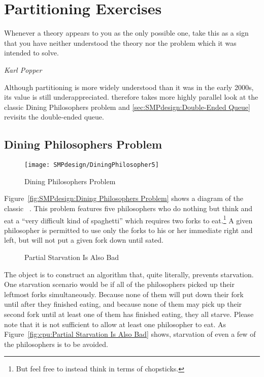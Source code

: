 
\section{Partitioning Exercises}
\label{sec:SMPdesign:Partitioning Exercises}
%
\epigraph{Whenever a theory appears to you as the only possible one,
	  take this as a sign that you have neither understood the theory
	  nor the problem which it was intended to solve.}
	  {\emph{Karl Popper}}

Although partitioning is more widely understood than it was in the early
2000s, its value is still underappreciated.
therefore takes more highly parallel look at the classic Dining
Philosophers problem and
\cref{sec:SMPdesign:Double-Ended Queue}
revisits the double-ended queue.

\subsection{Dining Philosophers Problem}
\label{sec:SMPdesign:Dining Philosophers Problem}

\begin{figure}[tb]
\centering
\texttt{[image: SMPdesign/DiningPhilosopher5]}
\caption{Dining Philosophers Problem}
\end{figure}

Figure~\ref{fig:SMPdesign:Dining Philosophers Problem} shows a diagram
of the classic ~\cite{Dijkstra1971HOoSP}.
This problem features five philosophers who do nothing but think and
eat a ``very difficult kind of spaghetti'' which requires two forks
to eat.\footnote{
	But feel free to instead think in terms of chopsticks.}
A given philosopher is permitted to use only the forks to his or her
immediate right and left, but will not put a given fork down until sated.

\begin{figure*}[tb]
\centering
{}
\caption{Partial Starvation Is Also Bad}
\end{figure*}

The object is to construct an algorithm that, quite literally,
prevents starvation.
One starvation scenario would be if all of the philosophers picked up
their leftmost forks simultaneously.
Because none of them will put down their fork until after they finished
eating, and because none of them may pick up their second fork until at
least one of them has finished eating, they all starve.
Please note that it is not sufficient to allow at least one philosopher
to eat.
As Figure~\ref{fig:cpu:Partial Starvation Is Also Bad}
shows, starvation of even a few of the philosophers is to be avoided.

